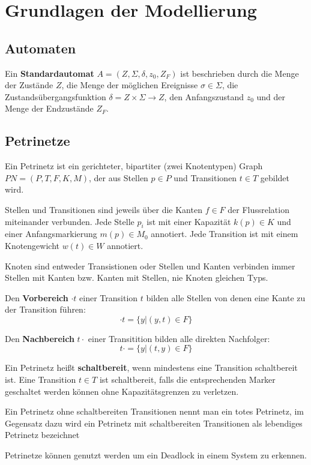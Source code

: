 \chapter{Grundlagen der Modellierung}
\section{Automaten}
\begin{tcolorbox}
Ein \textbf{Standardautomat} $A=(Z, \Sigma, \delta, z_0, Z_F)$ ist beschrieben
durch die Menge der Zustände $Z$, die Menge der möglichen Ereignisse
$\sigma \in \Sigma$, die Zustandsübergangsfunktion $\delta = Z \times \Sigma \to Z$,
den Anfangszustand $z_0$ und der Menge der Endzustände $Z_F$.
\end{tcolorbox}

\section{Petrinetze}
\begin{tcolorbox}
Ein Petrinetz ist ein gerichteter, bipartiter (zwei Knotentypen) Graph
$PN=(P,T,F,K,M)$, der aus Stellen $p\in P$ und Transitionen $t \in T$ gebildet wird.

Stellen und Transitionen sind jeweils über die Kanten $f \in F$ der Flussrelation
miteinander verbunden. Jede Stelle $p_i$ ist mit einer Kapazität $k(p) \in K$ und
einer Anfangsmarkierung $m(p) \in M_0$ annotiert. Jede Transition ist mit einem
Knotengewicht $w(t)\in W$ annotiert.

Knoten sind entweder Transistionen oder Stellen und Kanten verbinden immer
Stellen mit Kanten bzw. Kanten mit Stellen, nie Knoten gleichen Typs.
\end{tcolorbox}

\begin{tcolorbox}
Den \textbf{Vorbereich} $\cdot t$ einer Transition $t$ bilden alle Stellen von
denen eine Kante zu der Transition führen:
\begin{equation}
    \cdot t = \{y | (y,t) \in F\}
\end{equation}

Den \textbf{Nachbereich} $t \cdot$ einer Transitition bilden alle direkten Nachfolger:
\begin{equation}
    t \cdot = \{y | (t, y) \in F\}
\end{equation}
\end{tcolorbox}

\begin{tcolorbox}
    Ein Petrinetz heißt \textbf{schaltbereit}, wenn mindestens eine Transition
    schaltbereit ist. Eine Transition $t \in T$ ist schaltbereit, falls die entsprechenden
    Marker geschaltet werden können ohne Kapazitätsgrenzen zu verletzen.
\end{tcolorbox}

\begin{tcolorbox}
    Ein Petrinetz ohne schaltbereiten Transitionen nennt man ein totes Petrinetz,
    im Gegensatz dazu wird ein Petrinetz mit schaltbereiten Transitionen als
    lebendiges Petrinetz bezeichnet
\end{tcolorbox}

Petrinetze können genutzt werden um ein Deadlock in einem System zu erkennen.

